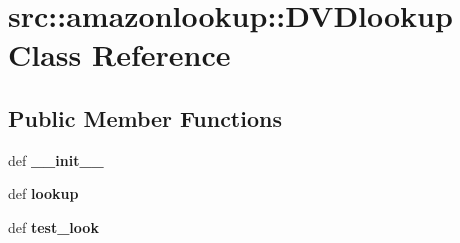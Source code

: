 \hypertarget{classsrc_1_1amazonlookup_1_1DVDlookup}{
\section{src::amazonlookup::DVDlookup Class Reference}
\label{classsrc_1_1amazonlookup_1_1DVDlookup}
}
\subsection*{Public Member Functions}
\begin{DoxyCompactItemize}
\item 
\hypertarget{classsrc_1_1amazonlookup_1_1DVDlookup_ad0b4981a86480bd3c15646842b75b1fa}{
def {\bfseries \_\-\_\-init\_\-\_\-}}
\label{classsrc_1_1amazonlookup_1_1DVDlookup_ad0b4981a86480bd3c15646842b75b1fa}

\item 
\hypertarget{classsrc_1_1amazonlookup_1_1DVDlookup_a95fec63cf869b45ad0bc9eec96704f9a}{
def {\bfseries lookup}}
\label{classsrc_1_1amazonlookup_1_1DVDlookup_a95fec63cf869b45ad0bc9eec96704f9a}

\item 
\hypertarget{classsrc_1_1amazonlookup_1_1DVDlookup_a6dd291da40cf80f92609f4fe855d2b8f}{
def {\bfseries test\_\-look}}
\label{classsrc_1_1amazonlookup_1_1DVDlookup_a6dd291da40cf80f92609f4fe855d2b8f}

\end{DoxyCompactItemize}
